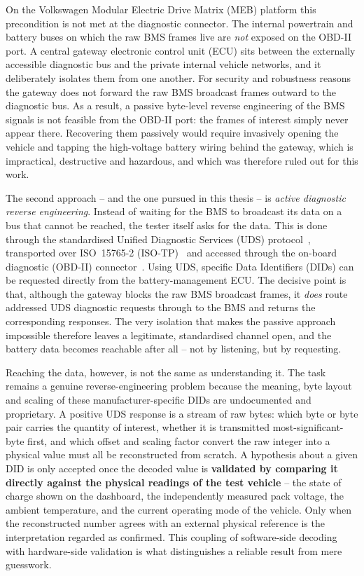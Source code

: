 \documentclass[11pt,a4paper,oneside,parskip=half]{scrreprt}
\begin{document}
On the Volkswagen Modular Electric Drive Matrix (MEB) platform this precondition is not met at the diagnostic connector. The internal powertrain and battery buses on which the raw BMS frames live are \emph{not} exposed on the OBD-II port. A central gateway electronic control unit (ECU) sits between the externally accessible diagnostic bus and the private internal vehicle networks, and it deliberately isolates them from one another. For security and robustness reasons the gateway does not forward the raw BMS broadcast frames outward to the diagnostic bus. As a result, a passive byte-level reverse engineering of the BMS signals is not feasible from the OBD-II port: the frames of interest simply never appear there. Recovering them passively would require invasively opening the vehicle and tapping the high-voltage battery wiring behind the gateway, which is impractical, destructive and hazardous, and which was therefore ruled out for this work.

The second approach -- and the one pursued in this thesis -- is \textit{active diagnostic reverse engineering}. Instead of waiting for the BMS to broadcast its data on a bus that cannot be reached, the tester itself asks for the data. This is done through the standardised Unified Diagnostic Services (UDS) protocol~\cite{iso14229}, transported over ISO~15765-2 (ISO-TP)~\cite{iso15765} and accessed through the on-board diagnostic (OBD-II) connector~\cite{saej1962}. Using UDS, specific Data Identifiers (DIDs) can be requested directly from the battery-management ECU. The decisive point is that, although the gateway blocks the raw BMS broadcast frames, it \emph{does} route addressed UDS diagnostic requests through to the BMS and returns the corresponding responses. The very isolation that makes the passive approach impossible therefore leaves a legitimate, standardised channel open, and the battery data becomes reachable after all -- not by listening, but by requesting.

Reaching the data, however, is not the same as understanding it. The task remains a genuine reverse-engineering problem because the meaning, byte layout and scaling of these manufacturer-specific DIDs are undocumented and proprietary. A positive UDS response is a stream of raw bytes: which byte or byte pair carries the quantity of interest, whether it is transmitted most-significant-byte first, and which offset and scaling factor convert the raw integer into a physical value must all be reconstructed from scratch. A hypothesis about a given DID is only accepted once the decoded value is \textbf{validated by comparing it directly against the physical readings of the test vehicle} -- the state of charge shown on the dashboard, the independently measured pack voltage, the ambient temperature, and the current operating mode of the vehicle. Only when the reconstructed number agrees with an external physical reference is the interpretation regarded as confirmed. This coupling of software-side decoding with hardware-side validation is what distinguishes a reliable result from mere guesswork.
\end{document}
